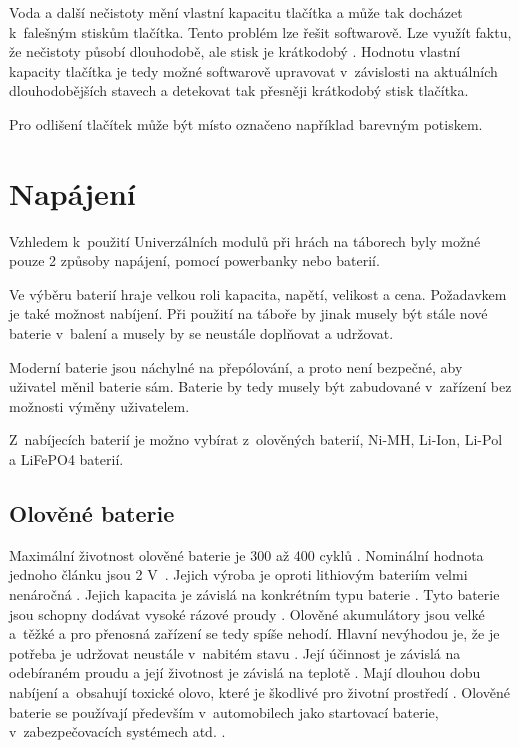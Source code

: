 Voda a další nečistoty mění vlastní kapacitu tlačítka a může tak docházet k~falešným stiskům tlačítka. Tento problém lze řešit softwarově. 
Lze využít faktu, že nečistoty působí dlouhodobě, ale stisk je krátkodobý \cite{PrincipKapTl}. Hodnotu vlastní kapacity tlačítka je tedy
možné softwarově upravovat v~závislosti na aktuálních dlouhodobějších stavech a detekovat tak přesněji krátkodobý stisk tlačítka.

Pro odlišení tlačítek může být místo označeno například barevným potiskem. 

\section{Napájení}
Vzhledem k~použití Univerzálních modulů při hrách na táborech byly možné pouze 2 způsoby napájení, pomocí powerbanky nebo baterií. 

Ve výběru baterií hraje velkou roli kapacita, napětí, velikost a cena. Požadavkem je také možnost nabíjení. Při použití na táboře by jinak musely být stále 
nové baterie v~balení a musely by se neustále doplňovat a udržovat.

Moderní baterie jsou náchylné na přepólování, a proto není bezpečné, aby uživatel měnil baterie sám. Baterie by tedy musely být zabudované v~zařízení 
bez možnosti výměny uživatelem. 


Z~nabíjecích baterií je možno vybírat z~olověných baterií, Ni-MH, Li-Ion, Li-Pol a LiFePO4 baterií.

\subsection{Olověné baterie}
Maximální životnost olověné baterie je 300 až 400 cyklů \cite{LiFePO4_malina}. Nominální hodnota jednoho článku jsou 2 V~\cite{olovene}. Jejich výroba je oproti
lithiovým bateriím velmi nenáročná \cite{olovene}. Jejich kapacita je závislá na konkrétním typu baterie \cite{olovene}. Tyto baterie jsou schopny dodávat vysoké
rázové proudy \cite{akumulatory}. Olověné akumulátory jsou velké a~těžké a pro přenosná zařízení se tedy spíše nehodí. Hlavní nevýhodou je, že je potřeba je udržovat 
neustále v~nabitém stavu \cite{olovene}. Její účinnost je závislá na odebíraném proudu a její životnost je závislá na teplotě \cite{olovene}. Mají dlouhou dobu 
nabíjení a~obsahují toxické olovo, které je škodlivé pro životní prostředí \cite{olovene}. Olověné baterie se používají především v~automobilech jako startovací 
baterie, v~zabezpečovacích systémech atd. \cite{olovene}.

